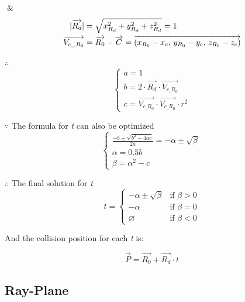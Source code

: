 $\And$
\[
\begin{array}{lr}
\begin{aligned}
\lvert \overrightarrow{R_d} \rvert &= \sqrt{x_{R_d}^2 + y_{R_d}^2 + z_{R_d}^2} = 1 \\
\overrightarrow{V_{c\_R_0}} &= \overrightarrow{R_0} - \overrightarrow{C} = \overrightarrow{(x_{R_0} - x_c,\,y_{R_0} - y_c,\,z_{R_0} - z_c)}
\end{aligned}
\end{array}
\]

$\therefore$
\[
\left\{
\begin{array}{lr}
a =1 \\
b = 2 \cdot \overrightarrow{R_d} \cdot \overrightarrow{V_{c\_R_0}} \\
c = \overrightarrow{V_{c\_R_0}} \cdot \overrightarrow{V_{c\_R_0}} \cdot r^2
\end{array}
\right.
\]

$\because$ The formula for \emph{t} can also be optimized
\[
\left\{
\begin{array}{lr}
\frac{-b \pm \sqrt{b^2 - 4ac}}{2a} = -\alpha \pm \sqrt{\beta} \\
\alpha = 0.5b \\
\beta = \alpha^2 - c
\end{array}
\right.
\]

$\therefore$ The final solution for \emph{t}
\[
t =
\begin{cases}
 -\alpha \pm \sqrt{\beta} & \text{if } \beta > 0 \\
-\alpha & \text{if } \beta = 0 \\
\varnothing & \text{if } \beta < 0
\end{cases}
\]

And the collision position for each \emph{t} is:

\[
\overrightarrow{P} = \overrightarrow{R_0} + \overrightarrow{R_d} \cdot t
\]

\subsection{Ray-Plane}
\parencite{stackoverflow.ray-plane.2014} \\

